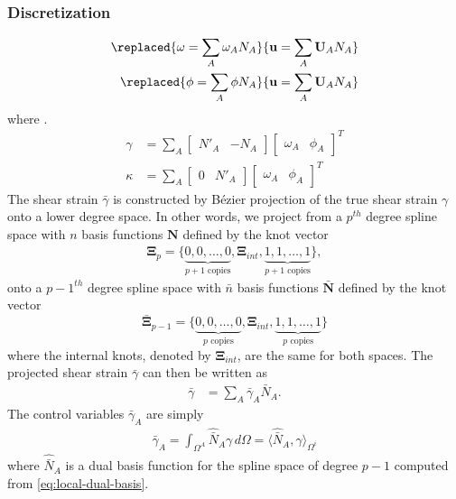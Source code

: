 \documentclass{article}
\begin{document}
\subsubsection{Discretization}
\begin{align}
  \replaced{\omega = \sum_A \omega_A N_A}{\mathbf{u} = \sum_A \mathbf{U}_A N_A} \\
  \replaced{\phi = \sum_A \phi N_A}{\mathbf{u} = \sum_A \mathbf{U}_A N_A}
\end{align}
where . 
{\color{blue}\begin{align}
\gamma &= \sum_A{\begin{bmatrix}N'_A & -N_A\end{bmatrix}\begin{bmatrix}\omega_A & \phi_A\end{bmatrix}^T} \\
\kappa &= \sum_A\begin{bmatrix}0 & N'_A\end{bmatrix}\begin{bmatrix}\omega_A & \phi_A\end{bmatrix}^T
\end{align}}
The shear strain $\bar{\gamma}$ is constructed by B\'{e}zier projection of the true shear strain $\gamma$ onto a lower degree space. In other words, we project from a $p^{th}$ degree spline space with $n$ basis functions $\mathbf{N}$ defined by the knot vector
\begin{align}
\mathbf{\Xi}_{p}=\lbrace{\underbrace{0,0,\ldots,0}_\text{$p+1$ copies}},\mathbf{\Xi}_{int},{\underbrace{1,1,\ldots,1}_\text{$p+1$ copies}}\rbrace,
\label{eq:origin_knot_vector}
\end{align}
onto a $p-1^{th}$ degree spline space with $\bar{n}$ basis functions $\bar{\mathbf{N}}$ defined by the knot vector
\begin{equation}
\bar{\mathbf{\Xi}}_{p-1}=\lbrace{\underbrace{0,0,\ldots,0}_\text{$p$ copies}},\mathbf{\Xi}_{int},{\underbrace{1,1,\ldots,1}_\text{$p$ copies}}\rbrace
\label{eq:projected_knot_vector}
\end{equation}
where the internal knots, denoted by $\mathbf{\Xi}_{int}$, are the same for both spaces. The projected shear strain $\bar{\gamma}$ can then be written as
\begin{align}
  \bar{\gamma} &= \sum_A \bar{\gamma}_A \bar{N}_A.
\end{align}
The control variables $\bar{\gamma}_A$ are simply
\begin{align}
  \bar{\gamma}_A = \int_{\Omega^A} \hat{\bar{N}}_A \gamma \, d\Omega = \langle \hat{\bar{N}}_A, \gamma \rangle_{\Omega^i}
\end{align}
where $\hat{\bar{N}}_A$ is a dual basis function for the spline space of degree $p-1$ computed from \eqref{eq:local-dual-basis}.
\end{document}
